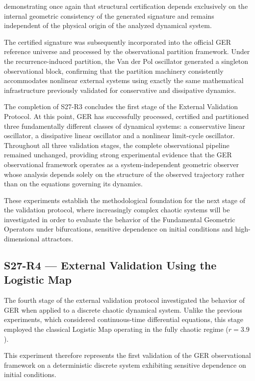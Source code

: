 demonstrating once again that structural certification depends exclusively on the internal geometric consistency of the generated signature and remains independent of the physical origin of the analyzed dynamical system.

The certified signature was subsequently incorporated into the official GER reference universe and processed by the observational partition framework. Under the recurrence-induced partition, the Van der Pol oscillator generated a singleton observational block, confirming that the partition machinery consistently accommodates nonlinear external systems using exactly the same mathematical infrastructure previously validated for conservative and dissipative dynamics.

The completion of S27-R3 concludes the first stage of the External Validation Protocol. At this point, GER has successfully processed, certified and partitioned three fundamentally different classes of dynamical systems: a conservative linear oscillator, a dissipative linear oscillator and a nonlinear limit-cycle oscillator. Throughout all three validation stages, the complete observational pipeline remained unchanged, providing strong experimental evidence that the GER observational framework operates as a system-independent geometric observer whose analysis depends solely on the structure of the observed trajectory rather than on the equations governing its dynamics.

These experiments establish the methodological foundation for the next stage of the validation protocol, where increasingly complex chaotic systems will be investigated in order to evaluate the behavior of the Fundamental Geometric Operators under bifurcations, sensitive dependence on initial conditions and high-dimensional attractors.

\subsection{S27-R4 --- External Validation Using the Logistic Map}

The fourth stage of the external validation protocol investigated the behavior of GER when applied to a discrete chaotic dynamical system. Unlike the previous experiments, which considered continuous-time differential equations, this stage employed the classical Logistic Map operating in the fully chaotic regime ($r=3.9$).

This experiment therefore represents the first validation of the GER observational framework on a deterministic discrete system exhibiting sensitive dependence on initial conditions.

